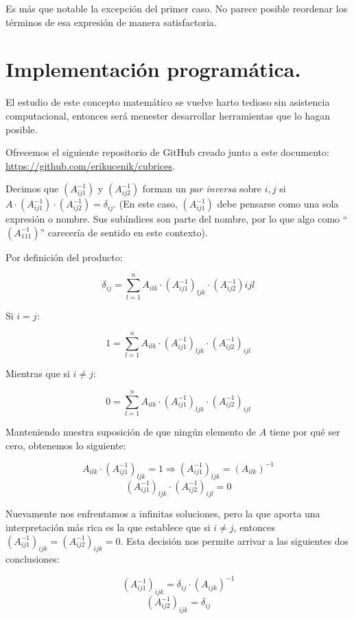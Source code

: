 \documentclass[a4paper, titlepage]{article}
\begin{document}
Es más que notable la excepción del primer caso. No parece posible reordenar los términos de esa expresión de manera satisfactoria.

\newpage

\section{Implementación programática.}

El estudio de este concepto matemático se vuelve harto tedioso sin asistencia computacional, entonces será menester desarrollar herramientas que lo hagan posible.

Ofrecemos el siguiente repositorio de GitHub creado junto a este documento: \href{https://github.com/erikucenik/cubrices}{https://github.com/erikucenik/cubrices}.

\iffalse

Decimos que $(A_{ij1}^{-1})$ y $(A_{ij2}^{-1})$ forman un \textit{par inversa} sobre $i,j$ si ${A\cdot (A_{ij1}^{-1}) \cdot (A_{ij2}^{-1}) = \delta_{ij}}$. (En este caso, $(A_{ij1}^{-1})$ debe pensarse como una sola expresión o nombre. Sus subíndices son parte del nombre, por lo que algo como ``$(A_{111}^{-1})$'' carecería de sentido en este contexto).

Por definición del producto:

$$\delta_{ij} = \sum\limits_{l=1}^{n} A_{ilk} \cdot (A_{ij1}^{-1})_{ljk} \cdot (A_{ij2}^{-1})ijl$$

Si $i = j$:

$$1 = \sum\limits_{l=1}^{n} A_{ilk} \cdot (A_{ij1}^{-1})_{ljk} \cdot (A_{ij2}^{-1})_{ijl}$$

Mientras que si $i \neq j$:

$$0 = \sum\limits_{l=1}^{n} A_{ilk} \cdot (A_{ij1}^{-1})_{ljk} \cdot (A_{ij2}^{-1})_{ijl}$$

Manteniendo nuestra suposición de que ningún elemento de $A$ tiene por qué ser cero, obtenemos lo siguiente:

$$A_{ilk} \cdot (A_{ij1}^{-1})_{ljk} = 1 \Rightarrow (A_{ij1}^{-1})_{ljk} = (A_{ilk})^{-1}$$
$$(A_{ij1}^{-1})_{ljk} \cdot (A_{ij2}^{-1})_{ijl} = 0$$

Nuevamente nos enfrentamos a infinitas soluciones, pero la que aporta una interpretación más rica es la que establece que si ${i \neq j}$, entonces ${(A_{ij1}^{-1})_{ijk} = (A_{ij2}^{-1})_{ijk} = 0}$. Esta decisión nos permite arrivar a las siguientes dos conclusiones:

$$(A_{ij1}^{-1})_{ijk} = \delta_{ij} \cdot (A_{ijk})^{-1}$$
$$(A_{ij2}^{-1})_{ijk} = \delta_{ij}$$
\end{document}
